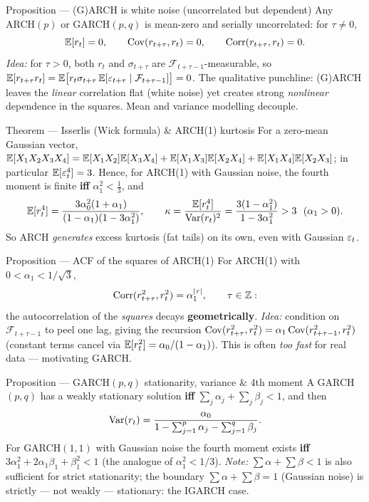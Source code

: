 \documentclass[11pt]{article}
\begin{document}
\begin{result}{Proposition --- (G)ARCH is white noise (uncorrelated but dependent)}
Any ARCH$(p)$ or GARCH$(p,q)$ is mean-zero and serially uncorrelated: for $\tau\ne0$,
\[
\mathbb{E}[r_t]=0,\qquad \operatorname{Cov}(r_{t+\tau},r_t)=0,\qquad \operatorname{Corr}(r_{t+\tau},r_t)=0 .
\]
\textit{Idea:} for $\tau>0$, both $r_t$ and $\sigma_{t+\tau}$ are $\mathcal F_{t+\tau-1}$-measurable,
so $\mathbb{E}[r_{t+\tau}r_t]=\mathbb{E}\big[r_t\sigma_{t+\tau}\,\mathbb{E}[\varepsilon_{t+\tau}\mid\mathcal F_{t+\tau-1}]\big]=0$.
The qualitative punchline: (G)ARCH leaves the \emph{linear} correlation flat (white noise) yet
creates strong \emph{nonlinear} dependence in the squares. Mean and variance modelling decouple.
\end{result}

\begin{result}{Theorem --- Isserlis (Wick formula) \& ARCH(1) kurtosis}
For a zero-mean Gaussian vector, $\mathbb{E}[X_1X_2X_3X_4]=\mathbb{E}[X_1X_2]\mathbb{E}[X_3X_4]+\mathbb{E}[X_1X_3]\mathbb{E}[X_2X_4]+\mathbb{E}[X_1X_4]\mathbb{E}[X_2X_3]$; in particular $\mathbb{E}[\varepsilon_t^4]=3$. Hence, for ARCH(1) with Gaussian noise, the
fourth moment is finite \textbf{iff} $\alpha_1^2<\tfrac13$, and
\[
\E[r_t^4]=\frac{3\alpha_0^2(1+\alpha_1)}{(1-\alpha_1)(1-3\alpha_1^2)},\qquad
\kappa=\frac{\E[r_t^4]}{\Var(r_t)^2}=\frac{3(1-\alpha_1^2)}{1-3\alpha_1^2}>3\ \ (\alpha_1>0).
\]
So ARCH \emph{generates} excess kurtosis (fat tails) on its own, even with Gaussian $\varepsilon_t$.
\end{result}

\begin{result}{Proposition --- ACF of the squares of ARCH(1)}
For ARCH(1) with $0<\alpha_1<1/\sqrt3$,
\[
\operatorname{Corr}(r_{t+\tau}^2,r_t^2)=\alpha_1^{\left\lvert \tau \right\rvert},\qquad \tau\in\mathbb{Z} :
\]
the autocorrelation of the \emph{squares} decays \textbf{geometrically}.
\textit{Idea:} condition on $\mathcal F_{t+\tau-1}$ to peel one lag, giving the recursion
$\operatorname{Cov}(r_{t+\tau}^2,r_t^2)=\alpha_1\operatorname{Cov}(r_{t+\tau-1}^2,r_t^2)$ (constant terms cancel via
$\mathbb{E}[r_t^2]=\alpha_0/(1-\alpha_1)$). This is often \emph{too fast} for real data --- motivating GARCH.
\end{result}

\begin{result}{Proposition --- GARCH$(p,q)$ stationarity, variance \& 4th moment}
A GARCH$(p,q)$ has a weakly stationary solution \textbf{iff} $\sum_j\alpha_j+\sum_j\beta_j<1$, and
then
\[
\operatorname{Var}(r_t)=\frac{\alpha_0}{1-\sum_{j=1}^{p}\alpha_j-\sum_{j=1}^{q}\beta_j}.
\]
For GARCH$(1,1)$ with Gaussian noise the fourth moment exists \textbf{iff}
$3\alpha_1^2+2\alpha_1\beta_1+\beta_1^2<1$ (the analogue of $\alpha_1^2<1/3$). \emph{Note:}
$\sum\alpha+\sum\beta<1$ is also sufficient for strict stationarity; the boundary
$\sum\alpha+\sum\beta=1$ (Gaussian noise) is strictly --- not weakly --- stationary: the IGARCH case.
\end{result}
\end{document}
